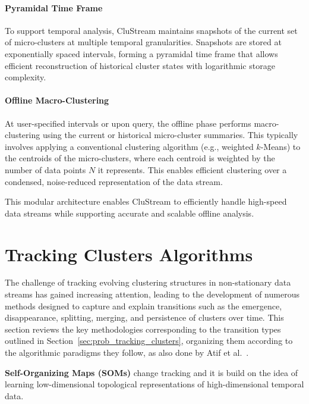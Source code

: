 

\paragraph{Pyramidal Time Frame} To support temporal analysis, CluStream maintains snapshots of the current set
of micro-clusters at multiple temporal granularities. Snapshots are stored at
exponentially spaced intervals, forming a pyramidal time frame that allows
efficient reconstruction of historical cluster states with logarithmic storage
complexity.

\paragraph{Offline Macro-Clustering} At user-specified intervals or upon query, the offline phase performs
macro-clustering using the current or historical micro-cluster summaries. This
typically involves applying a conventional clustering algorithm (e.g., weighted
$k$-Means) to the centroids of the micro-clusters, where each centroid is
weighted by the number of data points $N$ it represents. This enables efficient
clustering over a condensed, noise-reduced representation of the data stream.

This modular architecture enables CluStream to efficiently handle high-speed
data streams while supporting accurate and scalable offline analysis.

\section{Tracking Clusters Algorithms}\label{sec:tracking_clusters_algorithms}

The challenge of tracking evolving clustering structures in non-stationary data
streams has gained increasing attention, leading to the development of numerous
methods designed to capture and explain transitions such as the emergence,
disappearance, splitting, merging, and persistence of clusters over time. This
section reviews the key methodologies corresponding to the transition types
outlined in Section~\ref{sec:prob_tracking_clusters}, organizing them according
to the algorithmic paradigms they follow, as also done by Atif et
al.~\cite{tracking_review}.

\textbf{Self-Organizing Maps (SOMs)} change tracking and it is build on the idea of
learning low-dimensional topological representations of high-dimensional temporal data.

